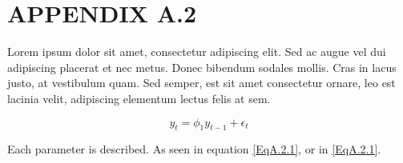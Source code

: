\section*{APPENDIX A.2}
\renewcommand{\theequation}{A.2.\arabic{equation}}
\setcounter{equation}{0}

Lorem ipsum dolor sit amet, consectetur adipiscing elit. Sed ac augue vel dui adipiscing placerat et nec metus. Donec bibendum sodales mollis. Cras in lacus justo, at vestibulum quam. Sed semper, est sit amet consectetur ornare, leo est lacinia velit, adipiscing elementum lectus felis at sem.

\begin{equation}
y_{t} = \phi_{1} y_{t-1} + \epsilon_{t}
\label{EqA.2.1}
\end{equation}

Each parameter is described. As seen in equation \eqref{EqA.2.1}, or in \ref{EqA.2.1}.